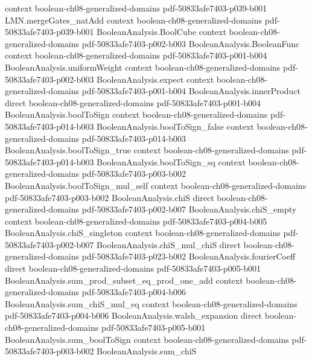 \begin{theorem}
  {context}
  {boolean-ch08-generalized-domains}
  {pdf-50833afe7403-p039-b001}
\proofstep
  {LMN.mergeGates_natAdd}
  {context}
  {boolean-ch08-generalized-domains}
  {pdf-50833afe7403-p039-b001}
\proofstep
  {BooleanAnalysis.BoolCube}
  {context}
  {boolean-ch08-generalized-domains}
  {pdf-50833afe7403-p002-b003}
\proofstep
  {BooleanAnalysis.BooleanFunc}
  {context}
  {boolean-ch08-generalized-domains}
  {pdf-50833afe7403-p001-b004}
\proofstep
  {BooleanAnalysis.uniformWeight}
  {context}
  {boolean-ch08-generalized-domains}
  {pdf-50833afe7403-p002-b003}
\proofstep
  {BooleanAnalysis.expect}
  {context}
  {boolean-ch08-generalized-domains}
  {pdf-50833afe7403-p001-b004}
\proofstep
  {BooleanAnalysis.innerProduct}
  {direct}
  {boolean-ch08-generalized-domains}
  {pdf-50833afe7403-p001-b004}
\proofstep
  {BooleanAnalysis.boolToSign}
  {context}
  {boolean-ch08-generalized-domains}
  {pdf-50833afe7403-p014-b003}
\proofstep
  {BooleanAnalysis.boolToSign_false}
  {context}
  {boolean-ch08-generalized-domains}
  {pdf-50833afe7403-p014-b003}
\proofstep
  {BooleanAnalysis.boolToSign_true}
  {context}
  {boolean-ch08-generalized-domains}
  {pdf-50833afe7403-p014-b003}
\proofstep
  {BooleanAnalysis.boolToSign_sq}
  {context}
  {boolean-ch08-generalized-domains}
  {pdf-50833afe7403-p003-b002}
\proofstep
  {BooleanAnalysis.boolToSign_mul_self}
  {context}
  {boolean-ch08-generalized-domains}
  {pdf-50833afe7403-p003-b002}
\proofstep
  {BooleanAnalysis.chiS}
  {direct}
  {boolean-ch08-generalized-domains}
  {pdf-50833afe7403-p002-b007}
\proofstep
  {BooleanAnalysis.chiS_empty}
  {context}
  {boolean-ch08-generalized-domains}
  {pdf-50833afe7403-p004-b005}
\proofstep
  {BooleanAnalysis.chiS_singleton}
  {context}
  {boolean-ch08-generalized-domains}
  {pdf-50833afe7403-p002-b007}
\proofstep
  {BooleanAnalysis.chiS_mul_chiS}
  {direct}
  {boolean-ch08-generalized-domains}
  {pdf-50833afe7403-p023-b002}
\proofstep
  {BooleanAnalysis.fourierCoeff}
  {direct}
  {boolean-ch08-generalized-domains}
  {pdf-50833afe7403-p005-b001}
\proofstep
  {BooleanAnalysis.sum_prod_subset_eq_prod_one_add}
  {context}
  {boolean-ch08-generalized-domains}
  {pdf-50833afe7403-p004-b006}
\proofstep
  {BooleanAnalysis.sum_chiS_mul_eq}
  {context}
  {boolean-ch08-generalized-domains}
  {pdf-50833afe7403-p004-b006}
\proofstep
  {BooleanAnalysis.walsh_expansion}
  {direct}
  {boolean-ch08-generalized-domains}
  {pdf-50833afe7403-p005-b001}
\proofstep
  {BooleanAnalysis.sum_boolToSign}
  {context}
  {boolean-ch08-generalized-domains}
  {pdf-50833afe7403-p003-b002}
\proofstep
  {BooleanAnalysis.sum_chiS}

\end{theorem}
